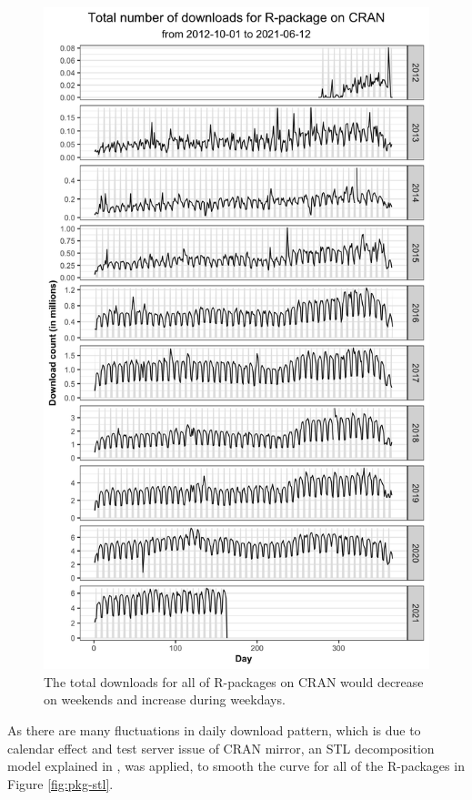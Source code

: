 \documentclass[
]{book}
\begin{document}
\begin{figure}

{\centering \includegraphics{figures/total-trend-1} 

}

\caption{The total downloads for all of R-packages on CRAN would decrease on weekends and increase during weekdays.}\label{fig:total-trend}
\end{figure}

As there are many fluctuations in daily download pattern, which is due to calendar effect and test server issue of CRAN mirror, an STL decomposition model explained in \textcite{stl}, was applied, to smooth the curve for all of the R-packages in Figure \ref{fig:pkg-stl}.
\end{document}
